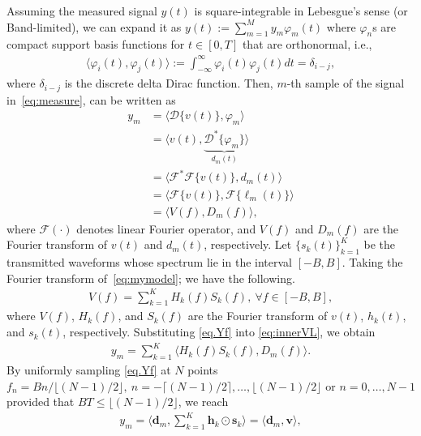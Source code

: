 \documentclass[conference,10pt]{IEEEtran}
\theoremstyle{remark}
\theoremstyle{plain}
\theoremstyle{definition}
\theoremstyle{remark}
\begin{document}
Assuming the measured signal $y(t)$ is square-integrable in Lebesgue’s sense (or Band-limited), we can expand it as $y(t):=  \sum\nolimits_{m=1}^M y_m \varphi_m(t)$  where  $\varphi_n$s  are compact support basis functions for $t\in [0, T]$ that are orthonormal, i.e., 
 \begin{align}
    \langle\varphi_i(t), \varphi_j(t) \rangle :=  \int_{-\infty}^{\infty}\varphi_i(t)\varphi_j(t) dt  = \delta_{i-j},     
 \end{align}
 where $\delta_{i-j}$ is the discrete delta Dirac function. Then, $m$-th sample of the signal in~\eqref{eq:measure}, can be written as 
 \begin{align}
    \label{eq:innerVL}
     \nonumber y_m &= \langle \mathcal{D}\{v(t)\}, \varphi_m \rangle  \\ \nonumber
     & = \langle v(t), \underbrace{\mathcal{D}^*\{\varphi_m \}}_{d_{m}(t)}\rangle \\ 
     \nonumber & = \langle \mathscr{F}^*\mathscr{F}\{v(t)\}, d_{m}(t)\rangle \\ & = \nonumber \langle \mathscr{F}\{v(t)\}, \mathscr{F}\{\ell_{m}(t)\}\rangle \\
     & = \langle V(f), D_m(f)\rangle,
 \end{align}
where $\mathscr{F}(\cdot)$ denotes linear Fourier operator, and $V(f)$ and $D_m(f)$ are the Fourier transform of $v(t)$ and $d_m(t)$, respectively. Let $\{s_k(t)\}_{k=1}^K$ be the transmitted waveforms whose spectrum lie in the interval $[-B,B]$. Taking the Fourier transform of~\eqref{eq:mymodel}; we have the following.
 \begin{align} \label{eq.Yf}
V(f)=\sum_{k=1}^{K}H_k(f)S_k(f), ~\forall f\in [-B,B],
 \end{align}   
 where $V(f)$, $H_k(f)$, and $S_k(f)$ are the Fourier transform of $v(t)$, $h_k(t)$, and $s_k(t)$, respectively. Substituting \eqref{eq.Yf} into \eqref{eq:innerVL}, we obtain
  \begin{align}
     \nonumber y_m = \sum_{k=1}^{K} \langle H_k(f)S_k(f), D_m(f)\rangle.
 \end{align}
 By uniformly sampling \eqref{eq.Yf} at $N$ points $f_n=Bn/\lfloor (N-1)/2\rfloor,~n= -\lceil (N-1)/2\rceil, \ldots, \lfloor (N-1)/2\rfloor$ or $n=0,\ldots, N-1$ provided that $BT\le \lfloor (N-1)/2\rfloor$, we reach
 \begin{align}\label{eq.sampledmodel1}
  y_m =  \langle \bm{d}_m, \sum_{k=1}^K \bm{h}_k\odot \bm{s}_k \rangle = \langle \bm{d}_m, \bm{v} \rangle,
 \end{align}
\end{document}
